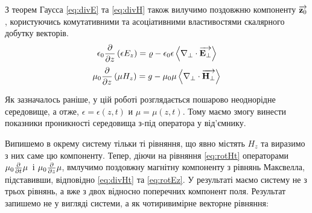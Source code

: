 З теорем Гаусса \eqref{eq:divE} та \eqref{eq:divH} також вилучимо 
поздовжню компоненту $ \overrightarrow{\mathbf z_0} $, користуючись комутативними та 
асоціативними властивостями скалярного добутку векторів.
%
%
\begin{equation} \label{eq:divEt} 
\epsilon_0 \frac{\partial }{\partial z} \left( \epsilon E_z \right) = 
\varrho - \epsilon_0 \epsilon \left< \nabla_\perp \cdot \overrightarrow{\mathbf E_\perp} \right>
\end{equation}
%
\begin{equation} \label{eq:divHt}
\mu_0 \frac{\partial }{\partial z} \left( \mu H_z \right) = 
g - \mu_0 \mu \left< \nabla_\perp \cdot \overrightarrow{\mathbf H_\perp} \right>
\end{equation}

Як зазначалось раніше, у цій роботі розглядається пошарово неоднорідне 
середовище, а отже, $ \epsilon = \epsilon(z,t) $ и $ \mu = \mu(z,t) $. Тому
маємо змогу винести показники проникності середовища з-під оператора у 
від'ємнику.

Випишемо в окрему систему тільки ті рівняння, що явно містять $ H_z $ та 
виразимо з них саме цю компоненту. Тепер, діючи на рівняння \eqref{eq:rotHt} 
операторами $ \mu_0 \frac{\partial }{\partial t} \mu $ і $ \mu_0 \frac{\partial }{\partial z} \mu $, 
вмлучимо поздовжну магнітну компоненту з рівнянь Максвелла, підставивши, 
відповідно \eqref{eq:divHt} та \eqref{eq:rotEz}. У результаті маємо систему 
не з трьох рівнянь, а вже з двох відносно поперечних компонент поля. 
Результат запишемо не у вигляді системи, а як чотиривимірне 
векторне рівняння:

